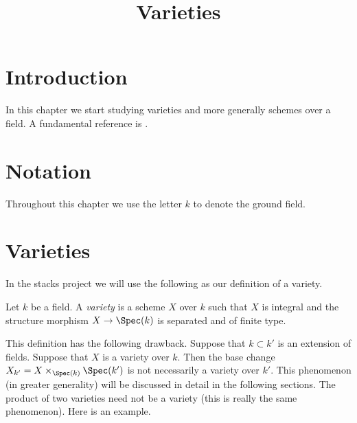 

%


\title{Varieties}


\maketitle

\label{section-phantom}

\tableofcontents

\section{Introduction}
\label{section-introduction}

\noindent
In this chapter we start studying varieties and more generally
schemes over a field. A fundamental reference is \cite{EGA}.








\section{Notation}
\label{section-notation}

\noindent
Throughout this chapter we use the letter $k$ to denote the ground field.










\section{Varieties}
\label{section-varieties}

\noindent
In the stacks project we will use the following as our definition
of a variety.

\begin{definition}
\label{definition-variety}
Let $k$ be a field. A {\it variety} is a scheme $X$ over $k$
such that $X$ is integral and the structure morphism
$X \to \Spec(k)$ is separated and of finite type.
\end{definition}

\noindent
This definition has the following drawback. Suppose that
$k \subset k'$ is an extension of fields. Suppose that $X$
is a variety over $k$. Then the base change
$X_{k'} = X \times_{\Spec(k)} \Spec(k')$ is
not necessarily a variety over $k'$. This phenomenon (in greater
generality) will be discussed in detail in the following sections.
The product of two varieties need not be a variety
(this is really the same phenomenon). Here is an example.

